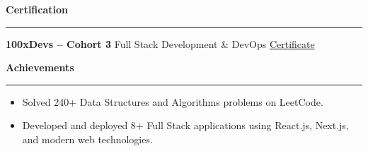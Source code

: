 \documentclass[10pt,a4paper]{article}
\newcommand{\cvsection}[1]{%
  \vspace{5pt}%
  {\large\bfseries #1}%
  \vspace{2pt}\hrule\vspace{4pt}%
}
\begin{document}
\cvsection{Certification}

\textbf{100xDevs -- Cohort 3} \;\textbar\; Full Stack Development \& DevOps \hfill \href{https://generateinvoice.teachx.in/generatecertificate/certificate/harkirat_db/75222/40409/12}{Certificate}

\cvsection{Achievements}

\begin{itemize}[label=$\bullet$, noitemsep, topsep=2pt, parsep=0pt, partopsep=0pt, leftmargin=1.2em]
    \item Solved 240+ Data Structures and Algorithms problems on LeetCode.
    \item Developed and deployed 8+ Full Stack applications using React.js, Next.js, and modern web technologies.
\end{itemize}
\end{document}
